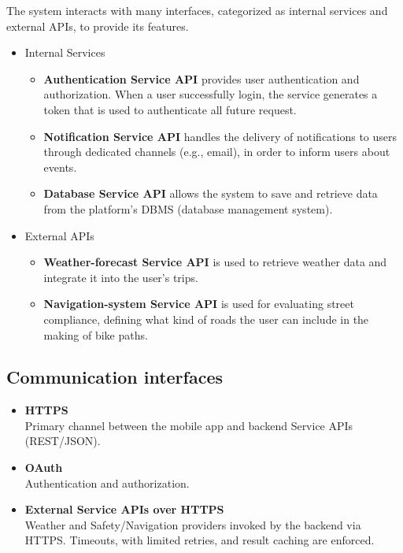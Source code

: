 \documentclass{Configuration_Files/PoliMi3i_thesis}
\begin{document}
    The system interacts with many interfaces, categorized as internal services and external APIs, to provide its features.

    \begin{itemize}
    	\item{Internal Services}
    	\begin{itemize}
    	    \item \textbf{Authentication Service API} provides user authentication and authorization. When a user successfully login, the service generates a token that is used to authenticate all future request.
    	    \item \textbf{Notification Service API} handles the delivery of notifications to users through dedicated channels (e.g., email), in order to inform users about events.
    	    \item \textbf{Database Service API} allows the system to save and retrieve data from the platform's DBMS (database management system).
    	\end{itemize}
    \end{itemize}
    
    \begin{itemize}
    	\item{External APIs}
    	\begin{itemize}
    	    \item \textbf{Weather-forecast Service API} is used to retrieve weather data and integrate it into the user's trips.
    	    \item \textbf{Navigation-system Service API} is used for evaluating street compliance, defining what kind of roads the user can include in the making of bike paths.
    	\end{itemize}
    \end{itemize}

\subsection{Communication interfaces}
\begin{itemize}
  \item \textbf{HTTPS} \\
  Primary channel between the mobile app and backend Service APIs (REST/JSON). 

  \item \textbf{OAuth} \\
  Authentication and authorization. 

  \item \textbf{External Service APIs over HTTPS} \\
  Weather and Safety/Navigation providers invoked by the backend via HTTPS. 
  Timeouts, with limited retries, and result caching are enforced.

\end{itemize}
\end{document}
